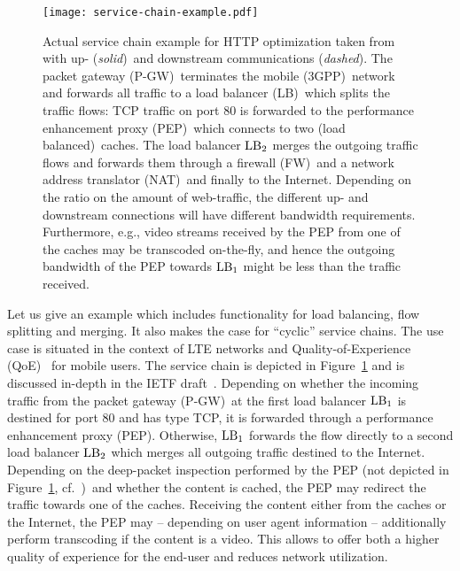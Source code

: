 \documentclass[10pt, conference, letterpaper]{IEEEtran}
\begin{document}
\begin{figure}[tbhp]
 \texttt{[image: service-chain-example.pdf]}
 \caption{Actual service chain example for HTTP  optimization taken from~\cite{ietf-draft-sc-use-cases-mobile-networks} with up- (\emph{solid})~and downstream communications (\emph{dashed}). The packet gateway (P-GW)~terminates the mobile (3GPP)~network and forwards all traffic to a load balancer (LB)~which splits the traffic flows: TCP traffic on port 80 is forwarded to the performance enhancement proxy (PEP)~which connects to two (load balanced)~caches. The load balancer $\textnormal{LB}_2$ merges the outgoing traffic flows and forwards them through a firewall (FW)~and a network address translator (NAT)~and finally to the Internet.
 Depending on the ratio on the amount of web-traffic, the different up- and downstream connections will have different bandwidth requirements. Furthermore, e.g., video streams received by the PEP from one of the caches may be transcoded on-the-fly, and hence the outgoing bandwidth of the PEP towards $\textnormal{LB}_1$ might be less than the traffic received.
 }
 \label{fig:service-chain-example}
 \end{figure}
 
 Let us give an example which includes  
functionality for load balancing, flow splitting and merging.
It also makes the case for ``cyclic'' service chains. 
The use case is situated in the context of 
LTE networks and Quality-of-Experience (QoE)~
for mobile users. The service chain is depicted in Figure~\ref{fig:service-chain-example}
and is discussed in-depth in the IETF draft~\cite{ietf-draft-sc-use-cases-mobile-networks}.
Depending on whether the incoming traffic from the packet gateway (P-GW)~at the first load balancer $\textnormal{LB}_1$ is destined for port 80 and has type TCP,
it is forwarded through a performance enhancement proxy (PEP). Otherwise, $\textnormal{LB}_1$ forwards the flow directly to a second load balancer $\textnormal{LB}_2$ which merges all outgoing traffic destined to the Internet. Depending on the deep-packet inspection 
performed by the PEP (not depicted in Figure~\ref{fig:service-chain-example}, cf.~\cite{ietf-draft-sc-use-cases-mobile-networks})~and whether the content is cached, the PEP may redirect the traffic towards one of the caches. Receiving the content either from the caches or the Internet, the PEP may -- depending on user agent information -- additionally perform transcoding if the content is a video. This allows to offer both a higher quality of experience for the end-user and reduces network utilization.
\end{document}
